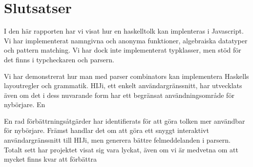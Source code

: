 \section{Slutsatser}
I den här rapporten har vi visat hur en haskelltolk kan implenteras i Javascript.
Vi har implementerat namngivna och anonyma funktioner, algebraiska datatyper och pattern matching. 
Vi har dock inte implementerat typklasser, men stöd för det finns i typcheckaren och parsern. 

Vi har demonstrerat hur man med parser combinators kan implementera Haskells layoutregler och grammatik. HIJi, ett enkelt användargränssnitt, har utvecklats även om det i dess nuvarande form har ett begränsat användningsområde för nybörjare. En

En rad förbättrningsåtgärder har identifierats för att göra tolken mer användbar för nybörjare. Främst handlar det om att göra ett snyggt interaktivt användargränssnitt till HIJi, men generera bättre felmeddelanden i parsern. 
Totalt sett har projektet visat sig vara lyckat, även om vi är medvetna om att mycket finns kvar att förbättra
